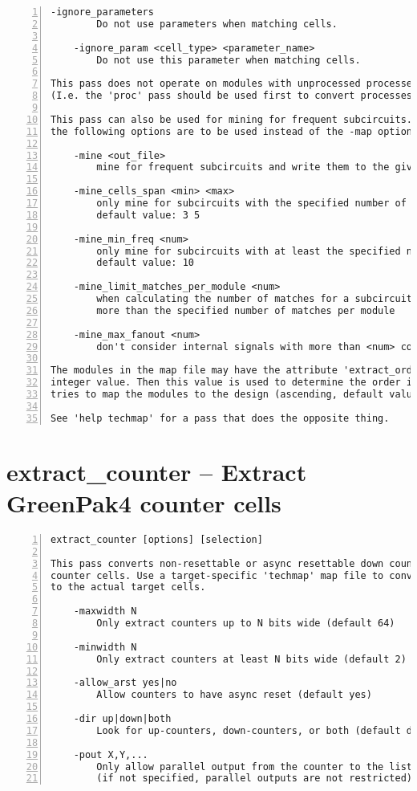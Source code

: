 \begin{lstlisting}[numbers=left,frame=single]
    -ignore_parameters
        Do not use parameters when matching cells.

    -ignore_param <cell_type> <parameter_name>
        Do not use this parameter when matching cells.

This pass does not operate on modules with unprocessed processes in it.
(I.e. the 'proc' pass should be used first to convert processes to netlists.)

This pass can also be used for mining for frequent subcircuits. In this mode
the following options are to be used instead of the -map option.

    -mine <out_file>
        mine for frequent subcircuits and write them to the given RTLIL file

    -mine_cells_span <min> <max>
        only mine for subcircuits with the specified number of cells
        default value: 3 5

    -mine_min_freq <num>
        only mine for subcircuits with at least the specified number of matches
        default value: 10

    -mine_limit_matches_per_module <num>
        when calculating the number of matches for a subcircuit, don't count
        more than the specified number of matches per module

    -mine_max_fanout <num>
        don't consider internal signals with more than <num> connections

The modules in the map file may have the attribute 'extract_order' set to an
integer value. Then this value is used to determine the order in which the pass
tries to map the modules to the design (ascending, default value is 0).

See 'help techmap' for a pass that does the opposite thing.
\end{lstlisting}

\section{extract\_counter -- Extract GreenPak4 counter cells}
\label{cmd:extract_counter}
\begin{lstlisting}[numbers=left,frame=single]
    extract_counter [options] [selection]

This pass converts non-resettable or async resettable down counters to
counter cells. Use a target-specific 'techmap' map file to convert those cells
to the actual target cells.

    -maxwidth N
        Only extract counters up to N bits wide (default 64)

    -minwidth N
        Only extract counters at least N bits wide (default 2)

    -allow_arst yes|no
        Allow counters to have async reset (default yes)

    -dir up|down|both
        Look for up-counters, down-counters, or both (default down)

    -pout X,Y,...
        Only allow parallel output from the counter to the listed cell types
        (if not specified, parallel outputs are not restricted)
\end{lstlisting}

